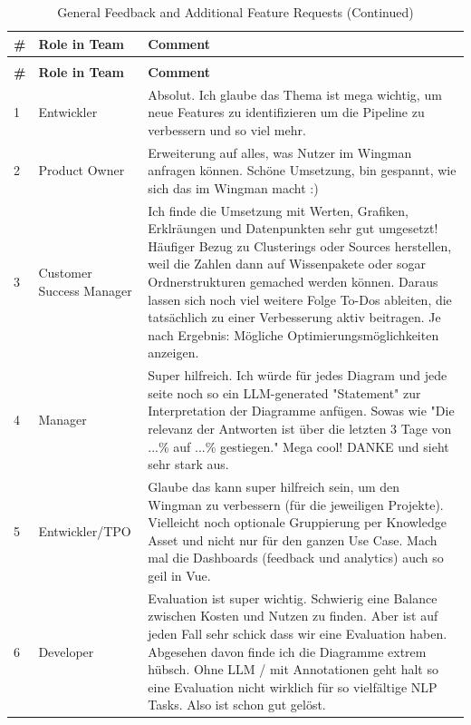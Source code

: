 \documentclass[
	english,
	ruledheaders=section,%
	class=report,%
	thesis={type=bachelor},%
	accentcolor=1b,%
	custommargins=true,%
	marginpar=false,%
	parskip=half-,%
	fontsize=11pt,%
	DIV=14,
]{tudapub}
\begin{document}
\begin{longtable}{l >{\RaggedRight}p{3cm} >{\RaggedRight}p{10cm}}
    \caption{General Feedback and Additional Feature Requests}
    \label{tab:general_feedback_de}\\
    \toprule
    \textbf{\#} & \textbf{Role in Team} & \textbf{Comment} \\
    \midrule
    \endfirsthead
    \caption[]{General Feedback and Additional Feature Requests (Continued)}\\
    \toprule
    \textbf{\#} & \textbf{Role in Team} & \textbf{Comment} \\
    \midrule
    \endhead
    \bottomrule
    \endlastfoot

    1 & Entwickler & Absolut. Ich glaube das Thema ist mega wichtig, um neue Features zu identifizieren um die Pipeline zu verbessern und so viel mehr. \\
    \midrule
    2 & Product Owner & Erweiterung auf alles, was Nutzer im Wingman anfragen können. Schöne Umsetzung, bin gespannt, wie sich das im Wingman macht :) \\
    \midrule
    3 & Customer Success Manager & Ich finde die Umsetzung mit Werten, Grafiken, Erklräungen und Datenpunkten sehr gut umgesetzt! Häufiger Bezug zu Clusterings oder Sources herstellen, weil die Zahlen dann auf Wissenpakete oder sogar Ordnerstrukturen gemached werden können. Daraus lassen sich noch viel weitere Folge To-Dos ableiten, die tatsächlich zu einer Verbesserung aktiv beitragen. Je nach Ergebnis: Mögliche Optimierungsmöglichkeiten anzeigen. \\
    \midrule
    4 & Manager & Super hilfreich. Ich würde für jedes Diagram und jede seite noch so ein LLM-generated "Statement" zur Interpretation der Diagramme anfügen. Sowas wie "Die relevanz der Antworten ist über die letzten 3 Tage von ...\% auf ...\% gestiegen." Mega cool! DANKE und sieht sehr stark aus. \\
    \midrule
    5 & Entwickler/TPO & Glaube das kann super hilfreich sein, um den Wingman zu verbessern (für die jeweiligen Projekte). Vielleicht noch optionale Gruppierung per Knowledge Asset und nicht nur für den ganzen Use Case. Mach mal die Dashboards (feedback und analytics) auch so geil in Vue. \\
    \midrule
    6 & Developer & Evaluation ist super wichtig. Schwierig eine Balance zwischen Kosten und Nutzen zu finden. Aber ist auf jeden Fall sehr schick dass wir eine Evaluation haben. Abgesehen davon finde ich die Diagramme extrem hübsch. Ohne LLM / mit Annotationen geht halt so eine Evaluation nicht wirklich für so vielfältige NLP Tasks. Also ist schon gut gelöst. \\

\end{longtable}
\end{document}
